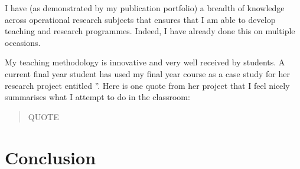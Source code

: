 \documentclass{article}
\begin{document}
I have (as demonstrated by my publication portfolio) a breadth of knowledge across operational research subjects that ensures that I am able to develop teaching and research programmes.
Indeed, I have already done this on multiple occasions.

My teaching methodology is innovative and very well received by students.
A current final year student has used my final year course as a case study for her research project entitled ''.
Here is one quote from her project that I feel nicely summarises what I attempt to do in the classroom:

\begin{quote}
    QUOTE
\end{quote}

\section{Conclusion}\label{sec:conclusion}

\newpage


\end{document}
